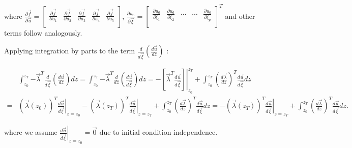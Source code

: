 \documentclass[11pt]{article}
\begin{document}
where $\frac{{\partial \vec f }}{{\partial \vec u }} = \left[ {\begin{matrix}
		{\frac{{\partial \vec f }}{{\partial {u_1}}}} & {\frac{{\partial \vec f }}{{\partial {u_2}}}} & {\frac{{\partial \vec f }}{{\partial {u_3}}}} & {\frac{{\partial \vec f }}{{\partial {u_4}}}} & {\frac{{\partial \vec f }}{{\partial {u_5}}}}  \\ 
\end{matrix} } \right]$, $\frac{{\partial {u_6}}}{{\partial \vec \xi  }} = {\left[ {\begin{matrix}
			{\frac{{\partial {u_6}}}{{\partial {\xi _1}}}} & {\frac{{\partial {u_6}}}{{\partial {\xi _2}}}} &  \cdots  &  \cdots  & {\frac{{\partial {u_6}}}{{\partial {\xi _p}}}}  \\ 
	\end{matrix} } \right]^T}$ and other terms follow analogously.

Applying integration by parts to the term ${\frac{d}{{d\vec \xi }}\left( {\frac{{d\vec u}}{{dz}}} \right)}$ :

\begin{equation}
	\begin{split}
		&\int_{{z_0}}^{{z_T}} { - {{\vec \lambda }^T}\frac{d}{{d\overrightarrow \xi  }}\left( {\frac{{d\vec u}}{{dz}}} \right)dz}  = \int_{{z_0}}^{{z_T}} { - {{\vec \lambda }^T}\frac{d}{{dz}}\left( {\frac{{d\vec u}}{{d\overrightarrow \xi  }}} \right)dz}  =  - \left. {\left[ {{{\vec \lambda }^T}\frac{{d\vec u}}{{d\overrightarrow \xi  }}} \right]} \right|_{{z_0}}^{{z_T}} + \int_{{z_0}}^{{z_T}} {{{\left( {\frac{{d\vec \lambda }}{{dz}}} \right)}^T}\frac{{d\vec u}}{{d\overrightarrow \xi  }}dz} \\
		= & {\left( {\vec \lambda \left( {{z_0}} \right)} \right)^T}{\left. {\frac{{d\vec u}}{{d\vec \xi }}} \right|_{z = {z_0}}} - {\left( {\vec \lambda \left( {{z_T}} \right)} \right)^T}{\left. {\frac{{d\vec u}}{{d\vec \xi }}} \right|_{z = {z_T}}} + \int_{{z_0}}^{{z_T}} {{{\left( {\frac{{d\vec \lambda }}{{dz}}} \right)}^T}\frac{{d\vec u}}{{d\vec \xi }}dz} =  - {\left( {\vec \lambda \left( {{z_T}} \right)} \right)^T}{\left. {\frac{{d\vec u}}{{d\vec \xi }}} \right|_{z = {z_T}}} + \int_{{z_0}}^{{z_T}} {{{\left( {\frac{{d\vec \lambda }}{{dz}}} \right)}^T}\frac{{d\vec u}}{{d\vec \xi }}dz} .
	\end{split}
	\label{eq007}
\end{equation}

where we assume ${\left. {\frac{{d\vec u}}{{d\vec \xi }}} \right|_{z = {z_0}}} = \vec 0$ due to initial condition independence. 
\end{document}
